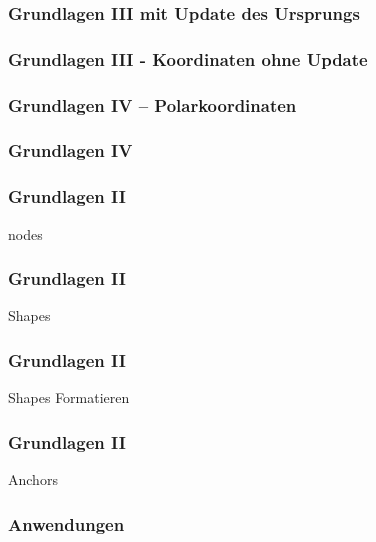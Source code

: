 \documentclass[14pt,ngerman]{beamer}
\begin{document}
\begin{frame}
\frametitle{Grundlagen III mit Update des Ursprungs}

\begin{center}
\end{center}

\end{frame}


\begin{frame}
\frametitle{Grundlagen III - Koordinaten ohne Update}

\begin{center}
\end{center}

\end{frame}

\begin{frame}
\frametitle{Grundlagen IV -- Polarkoordinaten}

\begin{center}
\end{center}

\end{frame}

\begin{frame}
\frametitle{Grundlagen IV}



\end{frame}

\begin{frame}
\frametitle{Grundlagen II}

nodes

\end{frame}


\begin{frame}
\frametitle{Grundlagen II}

Shapes

\end{frame}



\begin{frame}
\frametitle{Grundlagen II}

Shapes Formatieren

\end{frame}



\begin{frame}
\frametitle{Grundlagen II}

Anchors
\end{frame}

\begin{frame}
\frametitle{Anwendungen}


\end{frame}
\end{document}
